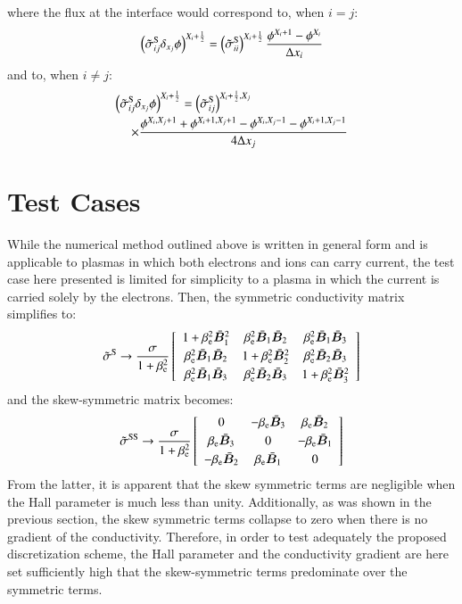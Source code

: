 \documentclass[twoside,9pt,twocolumn]{aiaa}
\newcommand{\alb}{\vspace{0.1cm}\\} %
\newcommand{\mfd}{\displaystyle}
\renewcommand{\vec}[1]{\bm{#1}}
\begin{document}
%
where the flux at the interface would correspond to, when $i=j$:
%
\begin{equation}
\left(\tilde{\sigma}_{ij}^{\rm S} \delta_{x_j} \phi \right)^{X_i+\frac{1}{2}}
=
\left(\tilde{\sigma}_{ii}^{\rm S}\right)^{X_i+\frac{1}{2}}
\frac{
\phi^{X_i+1}-\phi^{X_i}
}{
\Delta x_i
}
\end{equation}
%
and to, when $i\ne j$:
%
\begin{equation}
\begin{array}{l}
\mfd\left(\wtilde{\sigma}_{ij}^{\rm S} \delta_{x_j} \phi \right)^{X_i+\frac{1}{2}}
=
\left(\wtilde{\sigma}_{ij}^{\rm S}\right)^{X_i+\frac{1}{2},X_j}
\alb\mfd
~~~~~\times\frac{
\phi^{X_i,X_j+1}+\phi^{X_i+1,X_j+1}-\phi^{X_i,X_j-1}-\phi^{X_i+1,X_j-1}
}{
4 \Delta x_j
}
\end{array}
\end{equation}
%


\section{Test Cases}

While the numerical method outlined above is written in general form and is applicable to plasmas in which both electrons and ions can carry current, the test case here presented is limited for simplicity to a plasma in which the current is carried solely by the electrons. Then, the symmetric conductivity matrix simplifies to:
%
\begin{equation}
  \wtilde{\sigma}^{\rm S}\rightarrow \frac{\sigma}{1+\beta_{\rm e}^2}\left[ 
\begin{array}{ccc}
 1+\beta_{\rm e}^2 \bar{\vec{B}}_1^2 
 &  \beta_{\rm e}^2\bar{\vec{B}}_1 \bar{\vec{B}}_2
 &  \beta_{\rm e}^2\bar{\vec{B}}_1 \bar{\vec{B}}_3 \alb
 \beta_{\rm e}^2\bar{\vec{B}}_1 \bar{\vec{B}}_2
 &  1+\beta_{\rm e}^2\bar{\vec{B}}_2^2 
 &  \beta_{\rm e}^2\bar{\vec{B}}_2 \bar{\vec{B}}_3 \alb
 \beta_{\rm e}^2\bar{\vec{B}}_1 \bar{\vec{B}}_3
 &  \beta_{\rm e}^2\bar{\vec{B}}_2 \bar{\vec{B}}_3
 &  1+\beta_{\rm e}^2\bar{\vec{B}}_3^2 
\end{array}
\right]
\end{equation}
%
and the skew-symmetric matrix becomes:
%
\begin{equation}
  \wtilde{\sigma}^{\rm SS}\rightarrow \frac{ \sigma }{1+\beta_{\rm e}^2}\left[ 
\begin{array}{ccc}
0
 & -\beta_{\rm e}\bar{\vec{B}}_3
 & \beta_{\rm e}\bar{\vec{B}}_2 \alb
   \beta_{\rm e}\bar{\vec{B}}_3
 & 0
 & -\beta_{\rm e}\bar{\vec{B}}_1 \alb
-\beta_{\rm e}\bar{\vec{B}}_2
 & \beta_{\rm e}\bar{\vec{B}}_1
 & 0
\end{array}
\right]
\end{equation}
%
From the latter, it is apparent that the skew symmetric terms are negligible when the Hall parameter is much less than unity. Additionally, as was  shown in the previous section, the skew symmetric terms collapse to zero when there is no gradient of the conductivity. 
Therefore, in order to test adequately the proposed discretization scheme,  the Hall parameter and the conductivity gradient are here set sufficiently high that the skew-symmetric terms  predominate over the symmetric terms. 
\end{document}
